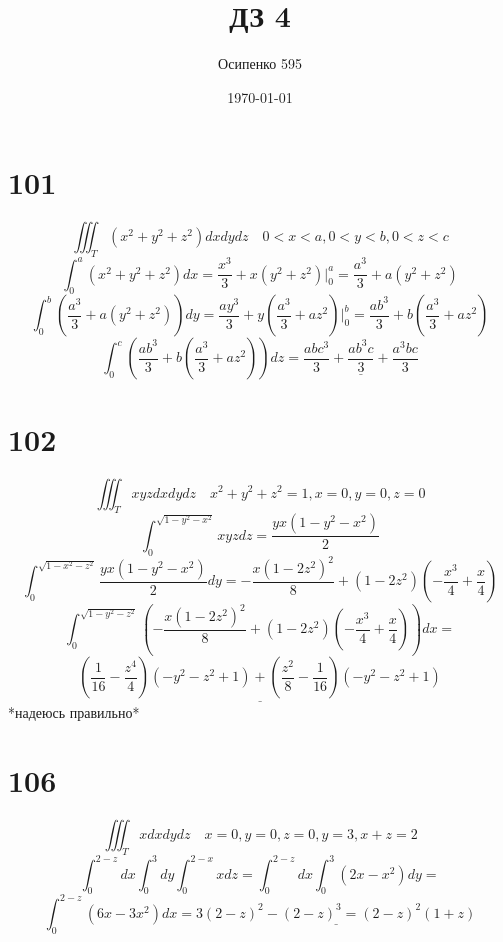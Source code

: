 \documentclass[a4paper, 12pt]{article}
\title{ДЗ 4}
\author{Осипенко 595}
\date{\today}
\begin{document}
\sffamily
\maketitle
\section*{101}
\[
	\iiint_T(x^2+y^2+z^2)dxdydz \quad 0<x<a,0<y<b,0<z<c
\]
\[
	\int_0^a (x^2+y^2+z^2)dx = \frac{x^3}{3}+x(y^2+z^2)\big|_0^a = \frac{a^3}{3} + a(y^2+z^2)
\]
\[
	\int_0^b (\frac{a^3}{3} + a(y^2+z^2)) dy = \frac{ay^3}{3} + y\left(\frac{a^3}{3} + az^2\right)\big|_0^b =\frac{ab^3}{3} + b(\frac{a^3}{3} + az^2)	 
\]
\[
	\int_0^c (\frac{ab^3}{3} + b(\frac{a^3}{3} + az^2))dz = \underline{\frac{abc^3}{3} + \frac{ab^3c}{3}+\frac{a^3bc}{3}}
\]
\section*{102}
\[
	\iiint_{T}{xyz dx dy dz} \quad x^2+y^2+z^2=1 ,x=0,y=0,z=0
\]
\[
	\int_0^{\sqrt{1-y^2-x^2}}xyz dz = \frac{yx(1-y^2-x^2)}{2}
\]
\[
	\int_0^{\sqrt{1-x^2-z^2}}\frac{yx(1-y^2-x^2)}{2}dy = -\frac{x(1-2z^2)^2}{8} + (1-2z^2)(-\frac{x^3}{4}+\frac{x}{4})
\]
\[
	\int_0^{\sqrt{1-y^2-z^2}}\left(-\frac{x(1-2z^2)^2}{8} + (1-2z^2)(-\frac{x^3}{4}+\frac{x}{4})\right) dx = 
\]
\[
	\underline{(\frac{1}{16}-\frac{z^4}{4})(-y^2-z^2+1)+(\frac{z^2}{8} -\frac{1}{16})(-y^2-z^2+1)}
\]
*надеюсь правильно*
\section*{106}
\[
	\iiint_{T}{x dx dy dz} \quad x=0,y=0,z=0,y=3,x+z=2
\]
\[
	\int_0^{2-z}dx\int_0^3dy\int_0^{2-x}xdz = \int_0^{2-z}dx\int_0^3 (2x-x^2)dy = 
\]
\[
	\int_0^{2-z}(6x-3x^2)dx = \underline{3(2-z)^2-(2-z)^3 = (2-z)^2(1+z)}
\]
\end{document}
